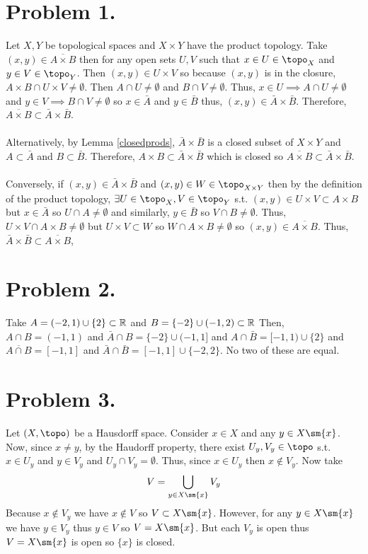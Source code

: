 \documentclass[12pt]{extarticle}
\begin{document}
 
\section*{Problem 1.}
Let $X, Y$ be topological spaces and $X \times Y$ have the product topology. Take $(x, y) \in \overline{A \times B}$ then for any open sets $U, V$ such that $x \in U \in \topo_X$ and $y \in V \in \topo_Y$. Then $(x, y) \in U \times V$ so because $(x,y)$ is in the closure, $A \times B \cap U \times V \neq \emptyset$. Then $A \cap U \neq \emptyset$ and $B \cap V \neq \emptyset$. Thus, $x \in U \implies A \cap U \neq \emptyset$ and $y \in V \implies B \cap V \neq \emptyset$ so $x \in \bar{A}$ and $y \in \bar{B}$ thus, $(x, y) \in \bar{A} \times \bar{B}$. Therefore, $\overline{A \times B} \subset \bar{A} \times \bar{B}$. \\ \\
Alternatively, by Lemma \ref{closedprods}, $\bar{A} \times \bar{B}$ is a closed subset of $X \times Y$ and $A \subset \bar{A}$ and $B \subset \bar{B}$. Therefore, $A \times B \subset \bar{A} \times \bar{B}$ which is closed so $\overline{A \times B} \subset \bar{A} \times \bar{B}$. 
\\ \\
Conversely, if $(x, y) \in \bar{A} \times \bar{B}$ and $(x, y) \in W \in \topo_{X \times Y}$ then by the definition of the product topology, $\exists U \in \topo_X, V \in \topo_Y$ s.t. $(x, y) \in U \times V \subset A \times B$ but $x \in \bar{A}$ so $U \cap A \neq \emptyset$ and similarly, $y \in \bar{B}$ so $V \cap B \neq \emptyset$. Thus, $U \times V \cap A \times B \neq \emptyset$ but $U \times V \subset W$ so $W \cap A \times B \neq \emptyset$ so $(x, y) \in \overline{A \times B}$. Thus, $\bar{A} \times \bar{B} \subset \overline{A \times B}$,

\section*{Problem 2.}
Take $A = \left(-2, 1 \right) \cup \{2 \} \subset \mathbb{R}$ and $B = \{-2\} \cup \left(-1, 2 \right) \subset \mathbb{R}$  \bigskip Then, $A \cap B = (-1, 1)$ and  $\bar{A} \cap B = \{-2 \} \cup (-1, 1]$ and $A \cap \bar{B} = [-1, 1) \cup \{2\}$ and $\overline{A \cap B} = [-1, 1]$ and $\bar{A} \cap \bar{B} = [-1,1] \cup \{-2, 2\}$. \bigskip No two of these are equal. 

\section*{Problem 3.}
Let $(X, \topo)$ be a Hausdorff space. Consider $x \in X$ and any $y \in X \sm \{x\}$. Now, since $x \neq y$, by the Haudorff property, there exist $U_y, V_y \in \topo$ s.t. $x \in U_y$ and $y \in V_y$ and $U_y \cap V_y = \emptyset$. Thus, since $x \in U_y$ then $x \notin V_y$. Now take \[V = \bigcup\limits_{y \in X \sm \{x\}} V_y\]
Because $x \notin V_y$ we have $x \notin V$ so $V \subset X \sm \{x\}$. However, for any $y \in X \sm \{x \}$ we have $y \in V_y$ thus $y \in V$ so $V = X \sm \{x\}$. But each $V_y$ is open thus $V = X \sm \{x\}$ is open so $\{x\}$ is closed. 
\end{document}
